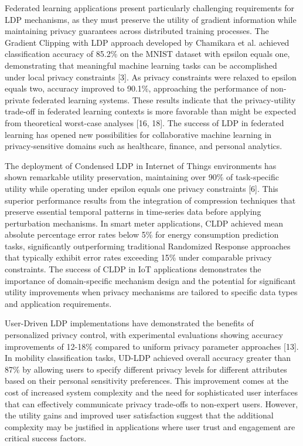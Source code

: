 \documentclass[conference]{IEEEtran}
\begin{document}
Federated learning applications present particularly challenging requirements for LDP mechanisms, as they must preserve the utility of gradient information while maintaining privacy guarantees across distributed training processes. The Gradient Clipping with LDP approach developed by Chamikara et al. achieved classification accuracy of 85.2\% on the MNIST dataset with epsilon equals one, demonstrating that meaningful machine learning tasks can be accomplished under local privacy constraints [3]. As privacy constraints were relaxed to epsilon equals two, accuracy improved to 90.1\%, approaching the performance of non-private federated learning systems. These results indicate that the privacy-utility trade-off in federated learning contexts is more favorable than might be expected from theoretical worst-case analyses [16, 18]. The success of LDP in federated learning has opened new possibilities for collaborative machine learning in privacy-sensitive domains such as healthcare, finance, and personal analytics.

The deployment of Condensed LDP in Internet of Things environments has shown remarkable utility preservation, maintaining over 90\% of task-specific utility while operating under epsilon equals one privacy constraints [6]. This superior performance results from the integration of compression techniques that preserve essential temporal patterns in time-series data before applying perturbation mechanisms. In smart meter applications, CLDP achieved mean absolute percentage error rates below 5\% for energy consumption prediction tasks, significantly outperforming traditional Randomized Response approaches that typically exhibit error rates exceeding 15\% under comparable privacy constraints. The success of CLDP in IoT applications demonstrates the importance of domain-specific mechanism design and the potential for significant utility improvements when privacy mechanisms are tailored to specific data types and application requirements.

User-Driven LDP implementations have demonstrated the benefits of personalized privacy control, with experimental evaluations showing accuracy improvements of 12-18\% compared to uniform privacy parameter approaches [13]. In mobility classification tasks, UD-LDP achieved overall accuracy greater than 87\% by allowing users to specify different privacy levels for different attributes based on their personal sensitivity preferences. This improvement comes at the cost of increased system complexity and the need for sophisticated user interfaces that can effectively communicate privacy trade-offs to non-expert users. However, the utility gains and improved user satisfaction suggest that the additional complexity may be justified in applications where user trust and engagement are critical success factors.
\end{document}
